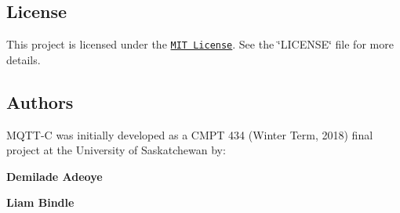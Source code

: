 \subsection*{License}

This project is licensed under the \href{https://opensource.org/licenses/MIT}{\tt M\+IT License}. See the {\ttfamily \char`\"{}\+L\+I\+C\+E\+N\+S\+E\char`\"{}} file for more details.

\subsection*{Authors}

M\+Q\+T\+T-\/C was initially developed as a C\+M\+PT 434 (Winter Term, 2018) final project at the University of Saskatchewan by\+:
\begin{DoxyItemize}
\item {\bfseries Demilade Adeoye}
\item {\bfseries Liam Bindle} 
\end{DoxyItemize}